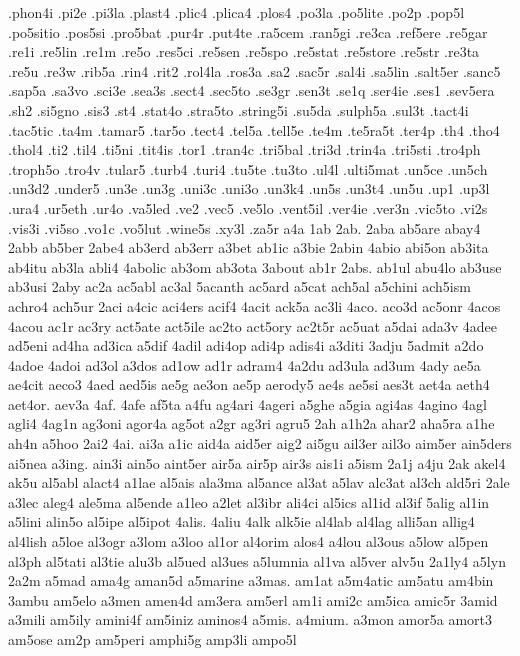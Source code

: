 {.phon4i
.pi2e
.pi3la
.plast4
.plic4
.plica4
.plos4
.po3la
.po5lite
.po2p
.pop5l
.po5sitio
.pos5si
.pro5bat
.pur4r
.put4te
.ra5cem
.ran5gi
.re3ca
.ref5ere
.re5gar
.re1i
.re5lin
.re1m
.re5o
.res5ci
.re5sen
.re5spo
.re5stat
.re5store
.re5str
.re3ta
.re5u
.re3w
.rib5a
.rin4
.rit2
.rol4la
.ros3a
.sa2
.sac5r
.sal4i
.sa5lin
.salt5er
.sanc5
.sap5a
.sa3vo
.sci3e
.sea3s
.sect4
.sec5to
.se3gr
.sen3t
.se1q
.ser4ie
.ses1
.sev5era
.sh2
.si5gno
.sis3
.st4
.stat4o
.stra5to
.string5i
.su5da
.sulph5a
.sul3t
.tact4i
.tac5tic
.ta4m
.tamar5
.tar5o
.tect4
.tel5a
.tell5e
.te4m
.te5ra5t
.ter4p
.th4
.tho4
.thol4
.ti2
.til4
.ti5ni
.tit4is
.tor1
.tran4c
.tri5bal
.tri3d
.trin4a
.tri5sti
.tro4ph
.troph5o
.tro4v
.tular5
.turb4
.turi4
.tu5te
.tu3to
.ul4l
.ulti5mat
.un5ce
.un5ch
.un3d2
.under5
.un3e
.un3g
.uni3c
.uni3o
.un3k4
.un5s
.un3t4
.un5u
.up1
.up3l
.ura4
.ur5eth
.ur4o
.va5led
.ve2
.vec5
.ve5lo
.vent5il
.ver4ie
.ver3n
.vic5to
.vi2s
.vis3i
.vi5so
.vo1c
.vo5lut
.wine5s
.xy3l
.za5r
a4a
1ab
2ab.
2aba
ab5are
abay4
2abb
ab5ber
2abe4
ab3erd
ab3err
a3bet
ab1ic
a3bie
2abin
4abio
abi5on
ab3ita
ab4itu
ab3la
abli4
4abolic
ab3om
ab3ota
3about
ab1r
2abs.
ab1ul
abu4lo
ab3use
ab3usi
2aby
ac2a
ac5abl
ac3al
5acanth
ac5ard
a5cat
ach5al
a5chini
ach5ism
achro4
ach5ur
2aci
a4cic
aci4ers
acif4
4acit
ack5a
ac3li
4aco.
aco3d
ac5onr
4acos
4acou
ac1r
ac3ry
act5ate
act5ile
ac2to
act5ory
ac2t5r
ac5uat
a5dai
ada3v
4adee
ad5eni
ad4ha
ad3ica
a5dif
4adil
adi4op
adi4p
adis4i
a3diti
3adju
5admit
a2do
4adoe
4adoi
ad3ol
a3dos
ad1ow
ad1r
adram4
4a2du
ad3ula
ad3um
4ady
ae5a
ae4cit
aeco3
4aed
aed5is
ae5g
ae3on
ae5p
aerody5
ae4s
ae5si
aes3t
aet4a
aeth4
aet4or.
aev3a
4af.
4afe
af5ta
a4fu
ag4ari
4ageri
a5ghe
a5gia
agi4as
4agino
4agl
agli4
4ag1n
ag3oni
agor4a
ag5ot
a2gr
ag3ri
agru5
2ah
a1h2a
ahar2
aha5ra
a1he
ah4n
a5hoo
2ai2
4ai.
ai3a
a1ic
aid4a
aid5er
aig2
ai5gu
ail3er
ail3o
aim5er
ain5ders
ai5nea
a3ing.
ain3i
ain5o
aint5er
air5a
air5p
air3s
ais1i
a5ism
2a1j
a4ju
2ak
akel4
ak5u
al5abl
alact4
a1lae
al5ais
ala3ma
al5ance
al3at
a5lav
alc3at
al3ch
ald5ri
2ale
a3lec
aleg4
ale5ma
al5ende
a1leo
a2let
al3ibr
ali4ci
al5ics
al1id
al3if
5alig
al1in
a5lini
alin5o
al5ipe
al5ipot
4alis.
4aliu
4alk
alk5ie
al4lab
al4lag
alli5an
allig4
al4lish
a5loe
al3ogr
a3lom
a3loo
al1or
al4orim
alos4
a4lou
al3ous
a5low
al5pen
al3ph
al5tati
al3tie
alu3b
al5ued
al3ues
a5lumnia
al1va
al5ver
alv5u
2a1ly4
a5lyn
2a2m
a5mad
ama4g
aman5d
a5marine
a3mas.
am1at
a5m4atic
am5atu
am4bin
3ambu
am5elo
a3men
amen4d
am3era
am5erl
am1i
ami2c
am5ica
amic5r
3amid
a3mili
am5ily
amini4f
am5iniz
aminos4
a5mis.
a4mium.
a3mon
amor5a
amort3
am5ose
am2p
am5peri
amphi5g
amp3li
ampo5l
}

